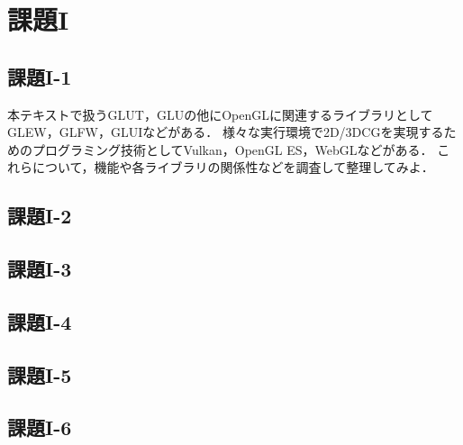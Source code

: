 \documentclass[]{jsarticle}
\begin{document}
\section{課題I}
\subsection{課題I-1}
本テキストで扱うGLUT，GLUの他にOpenGLに関連するライブラリとしてGLEW，GLFW，GLUIなどがある．
様々な実行環境で2D/3DCGを実現するためのプログラミング技術としてVulkan，OpenGL ES，WebGLなどがある．
これらについて，機能や各ライブラリの関係性などを調査して整理してみよ．
\subsection{課題I-2}
\subsection{課題I-3}
\subsection{課題I-4}
\subsection{課題I-5}
\subsection{課題I-6}
\end{document}
